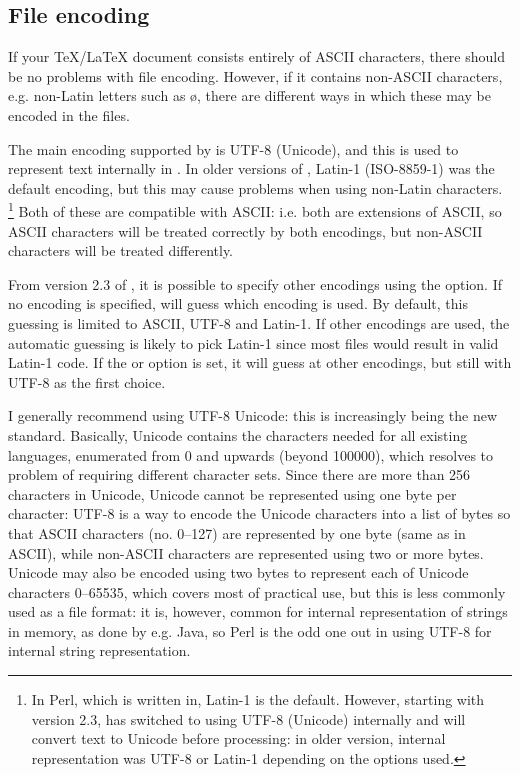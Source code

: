 \documentclass{article}
\begin{document}
\subsection{File encoding}

If your \TeX/\LaTeX{} document consists entirely of ASCII characters, there should be no problems with file encoding. However, if it contains non-ASCII characters, e.g. non-Latin letters such as \o{}, there are different ways in which these may be encoded in the files.

The main encoding supported by \TeXcount{} is UTF-8 (Unicode), and this is used to represent text internally in \TeXcount{}. In older versions of \TeXcount{}, Latin-1 (ISO-8859-1) was the default encoding, but this may cause problems when using non-Latin characters.%
\footnote{%
In Perl, which \TeXcount{} is written in, Latin-1 is the default. However, starting with version 2.3, \TeXcount{} has switched to using UTF-8 (Unicode) internally and will convert text to Unicode before processing: in older version, internal representation was UTF-8 or Latin-1 depending on the options used.}
Both of these are compatible with ASCII: i.e. both are extensions of ASCII, so ASCII characters will be treated correctly by both encodings, but non-ASCII characters will be treated differently.

From version 2.3 of \TeXcount{}, it is possible to specify other encodings using the  option. If no encoding is specified, \TeXcount{} will guess which encoding is used. By default, this guessing is limited to ASCII, UTF-8 and Latin-1. If other encodings are used, the automatic guessing is likely to pick Latin-1 since most files would result in valid Latin-1 code. If the  or  option is set, it will guess at other encodings, but still with UTF-8 as the first choice.

I generally recommend using UTF-8 Unicode: this is increasingly being the new standard. Basically, Unicode contains the characters needed for all existing languages, enumerated from 0 and upwards (beyond 100000), which resolves to problem of requiring different character sets. Since there are more than 256 characters in Unicode, Unicode cannot be represented using one byte per character: UTF-8 is a way to encode the Unicode characters into a list of bytes so that ASCII characters (no. 0--127) are represented by one byte (same as in ASCII), while non-ASCII characters are represented using two or more bytes. Unicode may also be encoded using two bytes to represent each of Unicode characters 0--65535, which covers most of practical use, but this is less commonly used as a file format: it is, however, common for internal representation of strings in memory, as done by e.g. Java, so Perl is the odd one out in using UTF-8 for internal string representation.
\end{document}
